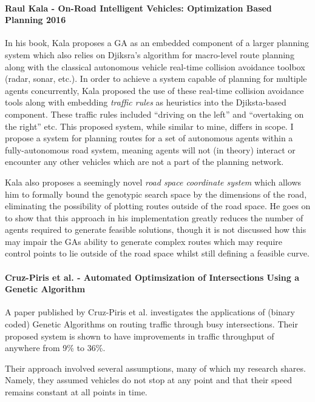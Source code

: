 \paragraph{Raul Kala - On-Road Intelligent Vehicles: Optimization Based Planning 2016\cite{kalaOptimizationBasedPlanning2016}}
In his book, Kala proposes a GA as an embedded component of a larger planning system which also relies on Djiksra's algorithm for macro-level route planning along with the classical autonomous vehicle real-time collision avoidance toolbox (radar, sonar, etc.). In order to achieve a system capable of planning for multiple agents concurrently, Kala proposed the use of these real-time collision avoidance tools along with embedding \textit{traffic rules} as heuristics into the Djiksta-based component. These traffic rules included ``driving on the left'' and ``overtaking on the right'' etc. This proposed system, while similar to mine, differs in scope. I propose a system for planning routes for a set of autonomous agents within a fully-autonomous road system, meaning agents will not (in theory) interact or encounter any other vehicles which are not a part of the planning network.

Kala also proposes a seemingly novel \textit{road space coordinate system} which allows him to formally bound the genotypic search space by the dimensions of the road, eliminating the possibility of plotting routes outside of the road space. He goes on to show that this approach in his implementation greatly reduces the number of agents required to generate feasible solutions, though it is not discussed how this may impair the GAs ability to generate complex routes which may require control points to lie outside of the road space whilst still defining a feasible curve.

\paragraph{Cruz-Piris et al. - Automated Optimsization of Intersections Using a Genetic Algorithm\cite{cruz-pirisAutomatedOptimizationIntersections2019}}

A paper published by Cruz-Piris et al. investigates the applications of (binary coded) Genetic Algorithms on routing traffic through busy intersections. Their proposed system is shown to have improvements in traffic throughput of anywhere from 9\% to 36\%.

Their approach involved several assumptions, many of which my research shares. Namely, they assumed vehicles do not stop at any point and that their speed remains constant at all points in time.

